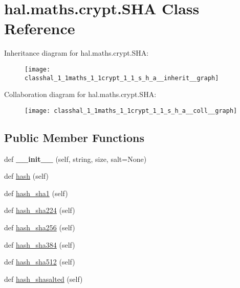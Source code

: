 \hypertarget{classhal_1_1maths_1_1crypt_1_1_s_h_a}{}\section{hal.\+maths.\+crypt.\+S\+HA Class Reference}
\label{classhal_1_1maths_1_1crypt_1_1_s_h_a}


Inheritance diagram for hal.\+maths.\+crypt.\+S\+HA\+:\nopagebreak
\begin{figure}[H]
\begin{center}
\leavevmode
\texttt{[image: classhal\_1\_1maths\_1\_1crypt\_1\_1\_s\_h\_a\_\_inherit\_\_graph]}
\end{center}
\end{figure}


Collaboration diagram for hal.\+maths.\+crypt.\+S\+HA\+:\nopagebreak
\begin{figure}[H]
\begin{center}
\leavevmode
\texttt{[image: classhal\_1\_1maths\_1\_1crypt\_1\_1\_s\_h\_a\_\_coll\_\_graph]}
\end{center}
\end{figure}
\subsection*{Public Member Functions}
\begin{DoxyCompactItemize}
\item 
def {\bfseries \+\_\+\+\_\+init\+\_\+\+\_\+} (self, string, size, salt=None)\hypertarget{classhal_1_1maths_1_1crypt_1_1_s_h_a_accde1fc65395f7ecd7869fa7a71961f1}{}\label{classhal_1_1maths_1_1crypt_1_1_s_h_a_accde1fc65395f7ecd7869fa7a71961f1}

\item 
def \hyperlink{classhal_1_1maths_1_1crypt_1_1_s_h_a_a4434870473a585d5382945a8cef6c7c3}{hash} (self)
\item 
def \hyperlink{classhal_1_1maths_1_1crypt_1_1_s_h_a_a87af3f937c0cfed513ea0720c4814246}{hash\+\_\+sha1} (self)
\item 
def \hyperlink{classhal_1_1maths_1_1crypt_1_1_s_h_a_ad258fade71cc488adc9e5cbcfaf7fc9c}{hash\+\_\+sha224} (self)
\item 
def \hyperlink{classhal_1_1maths_1_1crypt_1_1_s_h_a_aa2c42ae578cf76dc73cfd443fc931605}{hash\+\_\+sha256} (self)
\item 
def \hyperlink{classhal_1_1maths_1_1crypt_1_1_s_h_a_af0a05dbeeb0ec1f6530aa8c99937b44f}{hash\+\_\+sha384} (self)
\item 
def \hyperlink{classhal_1_1maths_1_1crypt_1_1_s_h_a_ad799ad40338287efb2a6f539954d35e9}{hash\+\_\+sha512} (self)
\item 
def \hyperlink{classhal_1_1maths_1_1crypt_1_1_s_h_a_a9ebefcb7012b2b306cd6b70feb646d8c}{hash\+\_\+shasalted} (self)
\end{DoxyCompactItemize}
